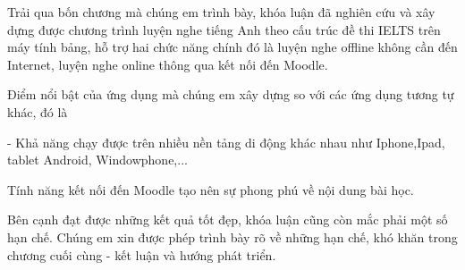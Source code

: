 Trải qua bốn chương mà chúng em trình bày, khóa luận đã nghiên cứu và xây dựng được chương trình luyện nghe tiếng Anh theo cấu trúc đề thi IELTS trên máy tính bảng, hỗ trợ hai chức năng chính đó là luyện nghe offline không cần đến Internet, luyện nghe online thông qua kết nối đến Moodle.

Điểm nổi bật của ứng dụng mà chúng em xây dựng so với các ứng dụng tương tự khác, đó là 

\quad - Khả năng chạy được trên nhiều nền tảng di động khác nhau như Iphone,Ipad, tablet Android, Windowphone,...

\quad Tính năng kết nối đến Moodle tạo nên sự phong phú về nội dung bài học.

Bên cạnh đạt được những kết quả tốt đẹp, khóa luận cũng còn mắc phải một số hạn chế. Chúng em xin được phép trình bày rõ về những hạn chế, khó khăn trong chương cuối cùng - kết luận và hướng phát triển.
 
